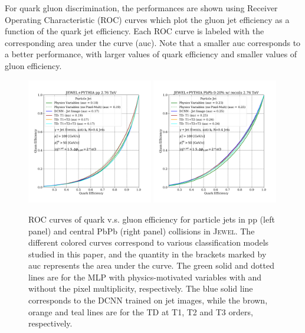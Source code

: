 \documentclass[notoc]{JHEP3}
\begin{document}
For quark gluon discrimination, the performances are shown using Receiver Operating Characteristic (ROC) curves which plot the gluon jet efficiency as a function of the quark jet efficiency. Each ROC curve is labeled with the corresponding area under the curve (auc). Note that a smaller auc corresponds to a better performance, with larger values of quark efficiency and smaller values of gluon efficiency.

\begin{figure}[t]
	\centering
	\includegraphics[width=0.49\textwidth]{plots/JEWELPYTHIA_pp_2p76TeV_genLevel_QvsG.pdf}
	\includegraphics[width=0.49\textwidth]{plots/JEWELPYTHIA_PbPb_2p76TeV_genLevel_QvsG.pdf}
	\caption{ROC curves of quark v.s. gluon efficiency for particle jets in pp (left panel) and central PbPb (right panel) collisions in \textsc{Jewel}. The different colored curves correspond to various classification models studied in this paper, and the quantity in the brackets marked by auc represents the area under the curve. The green solid and dotted lines are for the MLP with physics-motivated variables with and without the pixel multiplicity, respectively. The blue solid line corresponds to the DCNN trained on jet images, while the brown, orange and teal lines are for the TD at T1, T2 and T3 orders, respectively.}
\label{fig:ROC_all}
\end{figure}
\end{document}
